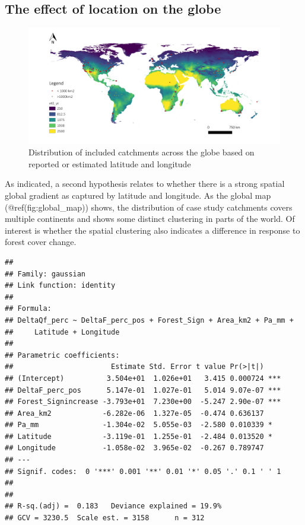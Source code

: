 \documentclass[]{elsarticle} %
\begin{document}
\hypertarget{the-effect-of-location-on-the-globe}{%
\subsection{The effect of location on the
globe}\label{the-effect-of-location-on-the-globe}}

\begin{figure}
\includegraphics[width=0.9\linewidth]{../../data/FAOET0data} \caption{Distribution of included catchments across the globe based on reported or estimated latitude and longitude}\label{fig:global_map}
\end{figure}

As indicated, a second hypothesis relates to whether there is a strong
spatial global gradient as captured by latitude and longitude. As the
global map (@ref(fig:global\_map)) shows, the distribution of case study
catchments covers multiple continents and shows some distinct clustering
in parts of the world. Of interest is whether the spatial clustering
also indicates a difference in response to forest cover change.

\begin{verbatim}
## 
## Family: gaussian 
## Link function: identity 
## 
## Formula:
## DeltaQf_perc ~ DeltaF_perc_pos + Forest_Sign + Area_km2 + Pa_mm + 
##     Latitude + Longitude
## 
## Parametric coefficients:
##                       Estimate Std. Error t value Pr(>|t|)    
## (Intercept)          3.504e+01  1.026e+01   3.415 0.000724 ***
## DeltaF_perc_pos      5.147e-01  1.027e-01   5.014 9.07e-07 ***
## Forest_Signincrease -3.793e+01  7.230e+00  -5.247 2.90e-07 ***
## Area_km2            -6.282e-06  1.327e-05  -0.474 0.636137    
## Pa_mm               -1.304e-02  5.055e-03  -2.580 0.010339 *  
## Latitude            -3.119e-01  1.255e-01  -2.484 0.013520 *  
## Longitude           -1.058e-02  3.965e-02  -0.267 0.789747    
## ---
## Signif. codes:  0 '***' 0.001 '**' 0.01 '*' 0.05 '.' 0.1 ' ' 1
## 
## 
## R-sq.(adj) =  0.183   Deviance explained = 19.9%
## GCV = 3230.5  Scale est. = 3158      n = 312
\end{verbatim}
\end{document}
